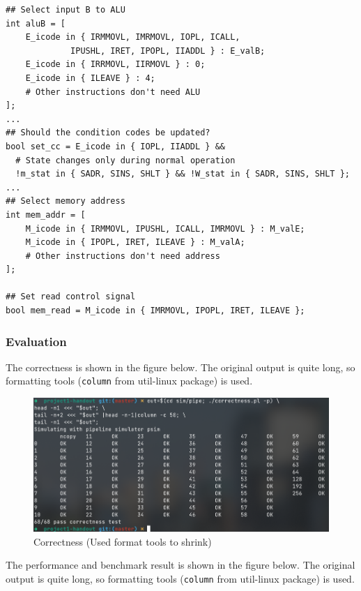 \documentclass{article}
\begin{document}
\begin{itemize}
\begin{lstlisting}
## Select input B to ALU
int aluB = [
	E_icode in { IRMMOVL, IMRMOVL, IOPL, ICALL, 
		     IPUSHL, IRET, IPOPL, IIADDL } : E_valB;
	E_icode in { IRRMOVL, IIRMOVL } : 0;
	E_icode in { ILEAVE } : 4;
	# Other instructions don't need ALU
];
...
## Should the condition codes be updated?
bool set_cc = E_icode in { IOPL, IIADDL } &&
  # State changes only during normal operation
  !m_stat in { SADR, SINS, SHLT } && !W_stat in { SADR, SINS, SHLT };
...
## Select memory address
int mem_addr = [
	M_icode in { IRMMOVL, IPUSHL, ICALL, IMRMOVL } : M_valE;
	M_icode in { IPOPL, IRET, ILEAVE } : M_valA;
	# Other instructions don't need address
];

## Set read control signal
bool mem_read = M_icode in { IMRMOVL, IPOPL, IRET, ILEAVE };
\end{lstlisting}
\end{itemize}

\subsubsection{Evaluation}

The correctness is shown in the figure below. The original output is quite long, so formatting tools (\texttt{column} from util-linux package) is used.

\begin{figure} [H]
        \includegraphics[width=\textwidth]{fig-correctness.png}
        \caption{Correctness (Used format tools to shrink)}
\end{figure}

The performance and benchmark result is shown in the figure below. The original output is quite long, so formatting tools (\texttt{column} from util-linux package) is used.
\end{document}
